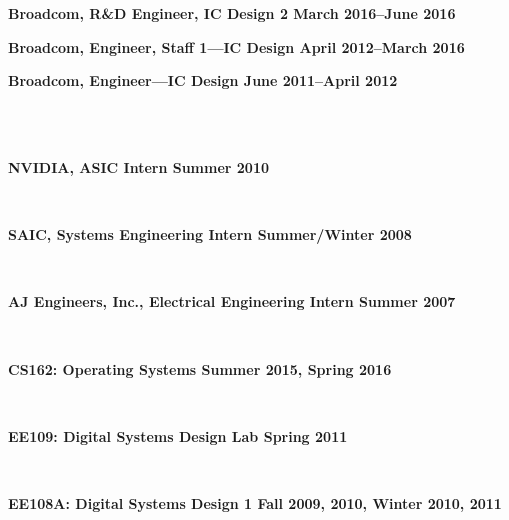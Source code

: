 \documentclass[10pt]{article} %
\begin{document}
\begin {minipage}[t]{0.2\linewidth}
\vspace{0pt}
\end {minipage}
\begin {minipage}[t]{0.8\linewidth}
\vspace{0pt}
\centerline {{\bf Broadcom, R\&D Engineer, IC Design 2 \hfill March 2016--June 2016}}
\centerline {{\bf Broadcom, Engineer, Staff 1---IC Design \hfill April 2012--March 2016}}
\centerline {{\bf Broadcom, Engineer---IC Design \hfill June 2011--April 2012}}
 \\

 \\
\centerline {\bf NVIDIA, ASIC Intern \hfill Summer 2010}
 \\

\centerline {\bf SAIC, Systems Engineering Intern \hfill Summer/Winter 2008}
 \\

\centerline {\bf AJ Engineers, Inc., Electrical Engineering Intern \hfill Summer 2007}
 \\

\end {minipage}

\begin {minipage}[t]{0.2\linewidth}
\vspace{0pt}
\end {minipage}
\begin {minipage}[t]{0.8\linewidth}
\vspace{0pt}

\centerline {{\bf CS162: Operating Systems \hfill Summer 2015, Spring 2016}}
 \\

\centerline {{\bf EE109: Digital Systems Design Lab \hfill Spring 2011}}
 \\

\centerline {{\bf EE108A: Digital Systems Design 1 \hfill Fall 2009, 2010, Winter 2010, 2011}}
 \\
\end {minipage}
\end{document}
